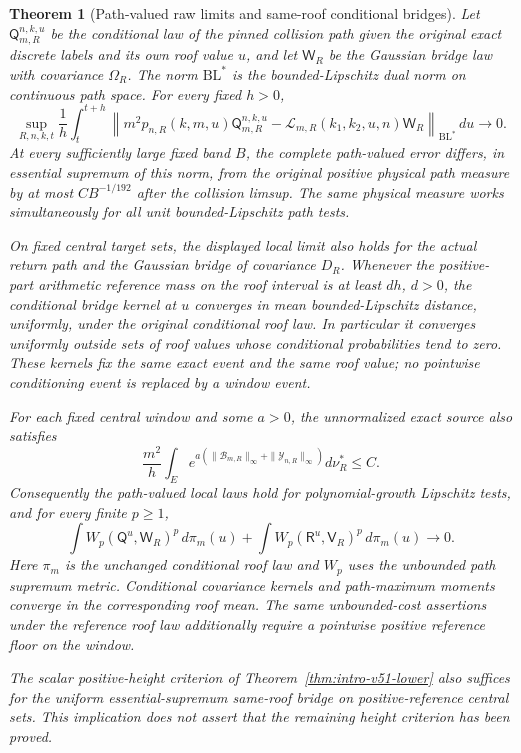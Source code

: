 \documentclass[11pt,reqno]{amsart}
\numberwithin{equation}{section}
\newtheorem{leadtheorem}{Theorem}
\theoremstyle{definition}\newtheorem{definition}[theorem]{Definition}
\theoremstyle{remark}\newtheorem{remark}[theorem]{Remark}
\begin{document}
\begin{leadtheorem}[Path-valued raw limits and same-roof conditional bridges]
\label{thm:intro-v52-path}
Let $\mathsf Q_{m,R}^{n,k,u}$ be the conditional law of the pinned
collision path given the original exact discrete labels and its own
roof value $u$, and let $\mathsf W_R$ be the Gaussian bridge law with
covariance $\Omega_R$. The norm $\mathrm{BL}^*$ is the bounded-Lipschitz
dual norm on continuous path space. For every fixed $h>0$,
\[
 \sup_{R,n,k,t}\frac1h\int_t^{t+h}
 \left\|m^2p_{n,R}(k,m,u)\mathsf Q_{m,R}^{n,k,u}
      -\mathcal L_{m,R}(k_1,k_2,u,n)\mathsf W_R\right\|_{\mathrm{BL}^*}
 \,du\longrightarrow0.
\]
At every sufficiently large fixed band $B$, the complete path-valued
error differs, in essential supremum of this norm, from the original
positive physical path measure by at most $CB^{-1/192}$ after the
collision limsup. The same physical measure works simultaneously for
all unit bounded-Lipschitz path tests.

On fixed central target sets, the displayed local limit also holds
for the actual return path and the Gaussian bridge of covariance
$D_R$. Whenever the positive-part arithmetic reference mass on the
roof interval is at least $dh$, $d>0$, the conditional bridge kernel
at $u$ converges in mean bounded-Lipschitz distance, uniformly, under
the original conditional roof law. In particular it converges uniformly
outside sets of roof values whose conditional probabilities tend to
zero. These kernels fix the same exact event and the same roof value;
no pointwise conditioning event is replaced by a window event.

For each fixed central window and some $a>0$, the unnormalized exact
source also satisfies
\[
 \frac{m^2}{h}\int_E
 e^{a(\|\mathcal B_{m,R}\|_\infty+\|\mathcal Y_{n,R}\|_\infty)}
                                                 d\nu_R^*\le C.
\]
Consequently the path-valued local laws hold for polynomial-growth
Lipschitz tests, and for every finite $p\ge1$,
\[
 \int W_p(\mathsf Q^u,\mathsf W_R)^p\,d\pi_m(u)
  +\int W_p(\mathsf R^u,\mathsf V_R)^p\,d\pi_m(u)\longrightarrow0.
\]
Here $\pi_m$ is the unchanged conditional roof law and $W_p$ uses the
unbounded path supremum metric. Conditional covariance kernels and
path-maximum moments converge in the corresponding roof mean. The
same unbounded-cost assertions under the reference roof law additionally
require a pointwise positive reference floor on the window.

The scalar positive-height criterion of Theorem~\ref{thm:intro-v51-lower}
also suffices for the uniform essential-supremum same-roof bridge on
positive-reference central sets. This implication does not assert that
the remaining height criterion has been proved.
\end{leadtheorem}
\end{document}

